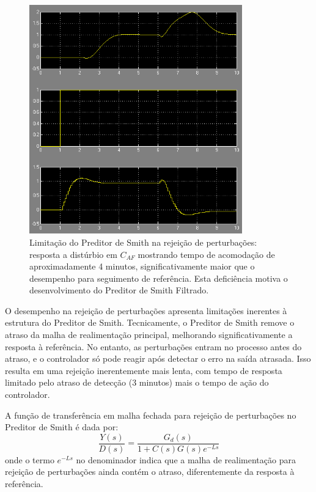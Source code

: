 \documentclass[a4paper,12pt]{article}
\begin{document}
   \begin{figure}[H]
  \centering
  \includegraphics[width=0.82\textwidth]{Imagens/q1p.png}
  \caption{Limitação do Preditor de Smith na rejeição de perturbações: resposta a distúrbio em $C_{AF}$ mostrando tempo de acomodação de aproximadamente 4 minutos, significativamente maior que o desempenho para seguimento de referência. Esta deficiência motiva o desenvolvimento do Preditor de Smith Filtrado.}
  \end{figure}

O desempenho na rejeição de perturbações apresenta limitações inerentes à estrutura do Preditor de Smith. Tecnicamente, o Preditor de Smith remove o atraso da malha de realimentação principal, melhorando significativamente a resposta à referência. No entanto, as perturbações entram no processo antes do atraso, e o controlador só pode reagir após detectar o erro na saída atrasada. Isso resulta em uma rejeição inerentemente mais lenta, com tempo de resposta limitado pelo atraso de detecção (3 minutos) mais o tempo de ação do controlador.

A função de transferência em malha fechada para rejeição de perturbações no Preditor de Smith é dada por:
\begin{equation}
\frac{Y(s)}{D(s)} = \frac{G_d(s)}{1 + C(s)G(s)e^{-Ls}}
\end{equation}
onde o termo $e^{-Ls}$ no denominador indica que a malha de realimentação para rejeição de perturbações ainda contém o atraso, diferentemente da resposta à referência.
\end{document}
